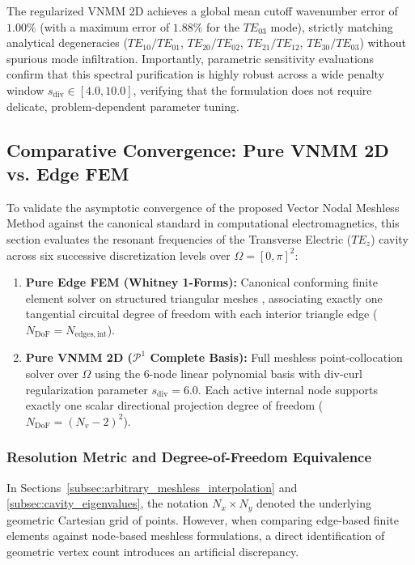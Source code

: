 \documentclass[preprint,12pt]{elsarticle}
\begin{document}
The regularized VNMM 2D achieves a global mean cutoff wavenumber error of $1.00\%$ (with a maximum error of $1.88\%$ for the $TE_{03}$ mode), strictly matching analytical degeneracies ($TE_{10}/TE_{01}$, $TE_{20}/TE_{02}$, $TE_{21}/TE_{12}$, $TE_{30}/TE_{03}$) without spurious mode infiltration. Importantly, parametric sensitivity evaluations confirm that this spectral purification is highly robust across a wide penalty window $s_{\mathrm{div}} \in [4.0, 10.0]$, verifying that the formulation does not require delicate, problem-dependent parameter tuning.

\subsection{Comparative Convergence: Pure VNMM 2D vs. Edge FEM}
\label{subsec:convergence_comparison}

To validate the asymptotic convergence of the proposed Vector Nodal Meshless Method against the canonical standard in computational electromagnetics, this section evaluates the resonant frequencies of the Transverse Electric ($TE_z$) cavity across six successive discretization levels over $\Omega = [0, \pi]^2$:
\begin{enumerate}
    \item \textbf{Pure Edge FEM (Whitney 1-Forms):} Canonical conforming finite element solver on structured triangular meshes \cite{monk2003finite}, associating exactly one tangential circuital degree of freedom with each interior triangle edge ($N_{\mathrm{DoF}} = N_{\mathrm{edges, int}}$).
    \item \textbf{Pure VNMM 2D ($\mathcal{P}^1$ Complete Basis):} Full meshless point-collocation solver over $\Omega$ using the 6-node linear polynomial basis with div-curl regularization parameter $s_{\mathrm{div}} = 6.0$. Each active internal node supports exactly one scalar directional projection degree of freedom ($N_{\mathrm{DoF}} = (N_v - 2)^2$).
\end{enumerate}

\subsubsection{Resolution Metric and Degree-of-Freedom Equivalence}
In Sections~\ref{subsec:arbitrary_meshless_interpolation} and \ref{subsec:cavity_eigenvalues}, the notation $N_x \times N_y$ denoted the underlying geometric Cartesian grid of points. However, when comparing edge-based finite elements against node-based meshless formulations, a direct identification of geometric vertex count introduces an artificial discrepancy. 
\end{document}
